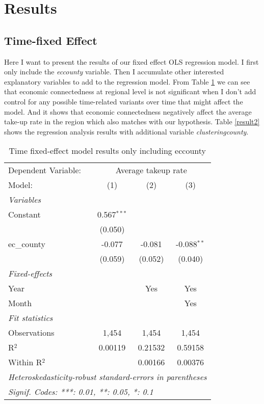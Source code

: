 \documentclass{article}
\begin{document}
\section{Results}
\subsection{Time-fixed Effect}
Here I want to present the results of our fixed effect OLS regression model. I first only include the \textit{ec\textunderscore county} variable. Then I accumulate other interested explanatory variables to add to the regression model. From Table \ref{result1} we can see that economic connectedness at regional level is not significant when I don't add control for any possible time-related variants over time that might affect the model. And it shows that economic connectedness negatively affect the average take-up rate in the region which also matches with our hypothesis.  Table \ref{result2} shows the regression analysis results with additional variable \textit{clustering\textunderscore county}. 



\begin{table}[htbp]
   \centering
   \begin{tabular}{lccc}
      \tabularnewline \midrule \midrule
      Dependent Variable: & \multicolumn{3}{c}{Average takeup rate}\\
      Model:       & (1)           & (2)     & (3)\\  
      \midrule
      \emph{Variables}\\
      Constant     & 0.567$^{***}$ &         &   \\   
                   & (0.050)       &         &   \\   
      ec\_county   & -0.077        & -0.081  & -0.088$^{**}$\\   
                   & (0.059)       & (0.052) & (0.040)\\   
      \midrule
      \emph{Fixed-effects}\\
      Year         &               & Yes     & Yes\\  
      Month        &               &         & Yes\\  
      \midrule
      \emph{Fit statistics}\\
      Observations & 1,454         & 1,454   & 1,454\\  
      R$^2$        & 0.00119       & 0.21532 & 0.59158\\  
      Within R$^2$ &               & 0.00166 & 0.00376\\  
      \midrule \midrule
      \multicolumn{4}{l}{\emph{Heteroskedasticity-robust standard-errors in parentheses}}\\
      \multicolumn{4}{l}{\emph{Signif. Codes: ***: 0.01, **: 0.05, *: 0.1}}\\
   \end{tabular}
   \caption{Time fixed-effect model results only including ec\textunderscore county}
      \label{result1}
\end{table}
\end{document}
